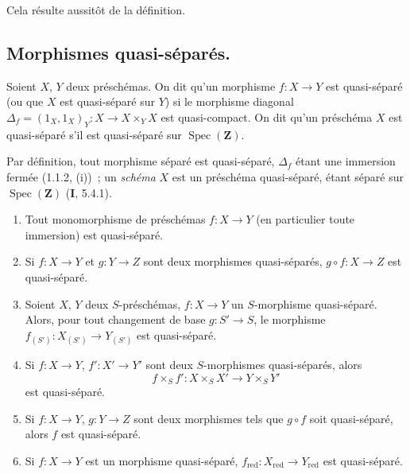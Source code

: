 Cela résulte aussitôt de la définition.

\subsection{Morphismes quasi-séparés.}
\label{subsection:IV.1.2-fr}

\begin{definition}[1.2.1]
\label{IV.1.2.1-fr}
Soient $X$, $Y$ deux préschémas. On dit qu'un morphisme $f:X\to Y$ est
quasi-séparé \textup{(ou que} $X$ est quasi-séparé sur $Y$\textup{)} si le
morphisme diagonal
$\Delta_f=(1_X,1_X)_Y:X\to X\times_Y X$ est quasi-compact. On dit qu'un
préschéma $X$ est quasi-séparé s'il est quasi-séparé sur
$\operatorname{Spec}(\mathbf Z)$.
\end{definition}

Par définition, tout morphisme séparé est quasi-séparé, $\Delta_f$ étant une
immersion fermée (1.1.2, (i))~; un \emph{schéma} $X$ est un préschéma
quasi-séparé, étant séparé sur $\operatorname{Spec}(\mathbf Z)$ (\textbf{I}, 5.4.1).

\begin{proposition}[1.2.2]
\label{IV.1.2.2-fr}
\begin{enumerate}
  \item[\textup{(i)}] Tout monomorphisme de préschémas $f:X\to Y$ (en particulier toute
  immersion) est quasi-séparé.
  \item[\textup{(ii)}] Si $f:X\to Y$ et $g:Y\to Z$ sont deux morphismes quasi-séparés,
  $g\circ f:X\to Z$ est quasi-séparé.
  \item[\textup{(iii)}] Soient $X$, $Y$ deux $S$-préschémas, $f:X\to Y$ un $S$-morphisme
  quasi-séparé. Alors, pour tout changement de base $g:S'\to S$, le morphisme
  $f_{(S')}:X_{(S')}\to Y_{(S')}$ est quasi-séparé.
  \item[\textup{(iv)}] Si $f:X\to Y$, $f':X'\to Y'$ sont deux $S$-morphismes quasi-séparés,
  alors
  \[
    f\times_S f':X\times_S X'\to Y\times_S Y'
  \]
  est quasi-séparé.
  \item[\textup{(v)}] Si $f:X\to Y$, $g:Y\to Z$ sont deux morphismes tels que $g\circ f$
  soit quasi-séparé, alors $f$ est quasi-séparé.
  \item[\textup{(vi)}] Si $f:X\to Y$ est un morphisme quasi-séparé,
  $f_{\mathrm{red}}:X_{\mathrm{red}}\to Y_{\mathrm{red}}$ est quasi-séparé.
\end{enumerate}
\end{proposition}

